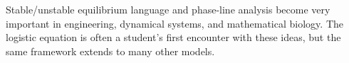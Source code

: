 \documentclass[12pt]{article}
\begin{document}
\begin{enrichmentbox}
Stable/unstable equilibrium language and phase-line analysis become very important in engineering, dynamical systems, and mathematical biology. The logistic equation is often a student's first encounter with these ideas, but the same framework extends to many other models.
\end{enrichmentbox}





\end{document}
